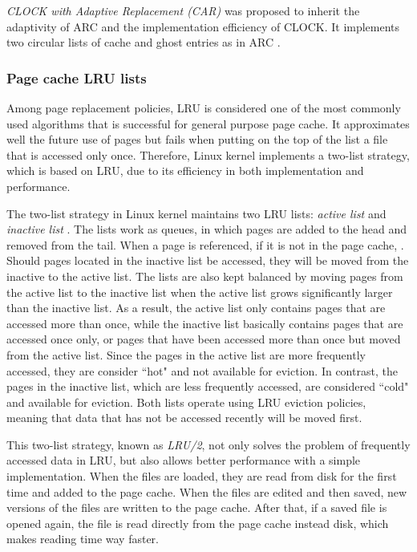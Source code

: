 \textit{CLOCK with Adaptive Replacement (CAR)} was proposed to inherit 
the adaptivity of ARC and the implementation efficiency of CLOCK.  
It implements two circular lists of cache and ghost entries as in ARC 
\cite{chavan2011comparison}. 

\subsubsection{Page cache LRU lists}

Among page replacement policies, LRU is considered one of the most commonly 
used algorithms that is successful for general purpose page cache. 
It approximates well the future use of pages but fails when putting on the 
top of the list a file that is accessed only once. 
Therefore, Linux kernel implements a two-list strategy, which is based on LRU, 
due to its efficiency in both implementation and performance. 

The two-list strategy in Linux kernel maintains two LRU lists: 
\textit{active list} and \textit{inactive list} 
\cite{linuxdev3rd2010,bovet2005understanding}.
The lists work as queues, in which pages are added to the head and 
removed from the tail.
When a page is referenced, if it is not in the page cache, .
Should pages located in the inactive list be accessed, they will be moved 
from the inactive to the active list. 
The lists are also kept balanced by moving pages from the active list to the 
inactive list when the active list grows significantly larger than the 
inactive list.
As a result, the active list only contains pages that are accessed more 
than once, while the inactive list basically contains pages that are accessed 
once only, or pages that have been accessed more than once but moved 
from the active list.
Since the pages in the active list are more frequently accessed, they are 
consider ``hot" and not available for eviction. In contrast, the pages in the 
inactive list, which are less frequently accessed, are considered ``cold" 
and available for eviction.
Both lists operate using LRU eviction policies, meaning that data that has
not be accessed recently will be moved first.

This two-list strategy, known as \textit{LRU/2}, not only solves the problem 
of frequently accessed data in LRU, but also allows better performance with 
a simple implementation. 
 When the files are loaded, they are 
read from disk for the first time and added to the page cache. 
When the files are edited and then saved, new versions of the files are 
written to the page cache.
After that, if a saved file is opened again, the file is read directly from 
the page cache instead disk, which makes reading time way faster.  


